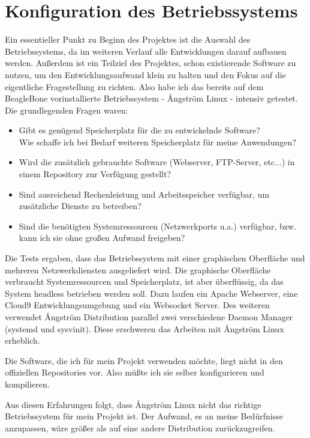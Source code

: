 \chapter{Konfiguration des Betriebssystems}

Ein essentieller Punkt zu Beginn des Projektes ist die Auswahl des Betriebssystems, da im weiteren Verlauf alle Entwicklungen darauf aufbauen werden. Außerdem ist ein Teilziel des Projektes, schon existierende Software zu nutzen, um den Entwicklungsaufwand klein zu halten und den Fokus auf die eigentliche Fragestellung zu richten. Also habe ich das bereits auf dem BeagleBone vorinstallierte Betriebssystem - {\AA}ngström Linux - intensiv getestet.\\

\noindent Die grundlegenden Fragen waren:

\begin{itemize}
  \item Gibt es genügend Speicherplatz für die zu entwickelnde Software?\\
  Wie schaffe ich bei Bedarf weiteren Speicherplatz für meine Anwendungen?
  \item Wird die zusätzlich gebrauchte Software (Webserver, FTP-Server, etc...) in einem Repository zur Verfügung gestellt?
  \item Sind ausreichend Rechenleistung und Arbeitsspeicher verfügbar, um zusätzliche Dienste zu betreiben?
  \item Sind die benötigten Systemressourcen (Netzwerkports u.a.) verfügbar, bzw. kann ich sie ohne großen Aufwand freigeben?
\end{itemize}

Die Tests ergaben, dass das Betriebssystem mit einer graphischen Oberfläche und mehreren Netzwerkdiensten ausgeliefert wird. 
Die graphische Oberfläche verbraucht Systemressourcen und Speicherplatz, ist aber überflüssig, da das System headless betrieben werden soll. Dazu laufen ein Apache Webserver, eine Cloud9 Entwicklungsumgebung und ein Websocket Server. Des weiteren verwendet {\AA}ngström Distribution parallel zwei verschiedene Daemon Manager (\gls{systemd} und \gls{sysvinit}). Diese erschweren das Arbeiten mit {\AA}ngström Linux erheblich.

Die Software, die ich für mein Projekt verwenden möchte, liegt nicht in den offiziellen Repositories vor. Also müßte ich sie selber konfigurieren und kompilieren.

Aus diesen Erfahrungen folgt, dass {\AA}ngström Linux nicht das richtige Betriebssystem für mein Projekt ist. Der Aufwand, es an meine Bedürfnisse anzupassen, wäre größer als auf eine andere Distribution zurückzugreifen.\\


